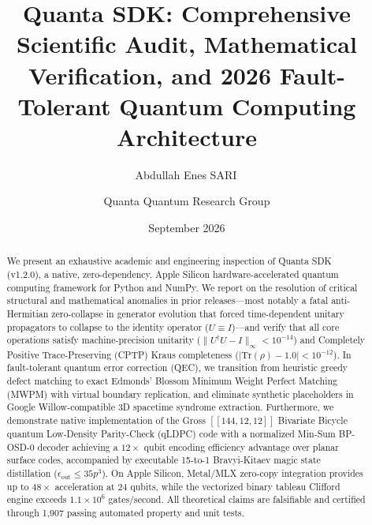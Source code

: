 \documentclass[aps,pra,reprint,superscriptaddress,amsmath,amssymb,floatfix]{revtex4-2}
\begin{document}
\title{Quanta SDK: Comprehensive Scientific Audit, Mathematical Verification, and 2026 Fault-Tolerant Quantum Computing Architecture}

\author{Abdullah Enes SARI\,}

\author{Quanta Quantum Research Group}

\date{September 2026}

\begin{abstract}
We present an exhaustive academic and engineering inspection of Quanta SDK (v1.2.0), a native, zero-dependency, Apple Silicon hardware-accelerated quantum computing framework for Python and NumPy. We report on the resolution of critical structural and mathematical anomalies in prior releases---most notably a fatal anti-Hermitian zero-collapse in generator evolution that forced time-dependent unitary propagators to collapse to the identity operator ($U \equiv I$)---and verify that all core operations satisfy machine-precision unitarity ($\|U^\dagger U - I\|_\infty < 10^{-14}$) and Completely Positive Trace-Preserving (CPTP) Kraus completeness ($|\text{Tr}(\rho)-1.0| < 10^{-12}$). In fault-tolerant quantum error correction (QEC), we transition from heuristic greedy defect matching to exact Edmonds' Blossom Minimum Weight Perfect Matching (MWPM) with virtual boundary replication, and eliminate synthetic placeholders in Google Willow-compatible 3D spacetime syndrome extraction. Furthermore, we demonstrate native implementation of the Gross $[[144, 12, 12]]$ Bivariate Bicycle quantum Low-Density Parity-Check (qLDPC) code with a normalized Min-Sum BP-OSD-0 decoder achieving a $12\times$ qubit encoding efficiency advantage over planar surface codes, accompanied by executable 15-to-1 Bravyi-Kitaev magic state distillation ($\epsilon_{\text{out}} \le 35 p^3$). On Apple Silicon, Metal/MLX zero-copy integration provides up to $48\times$ acceleration at 24 qubits, while the vectorized binary tableau Clifford engine exceeds $1.1 \times 10^6$ gates/second. All theoretical claims are falsifiable and certified through 1,907 passing automated property and unit tests.
\end{abstract}

\maketitle
\end{document}
